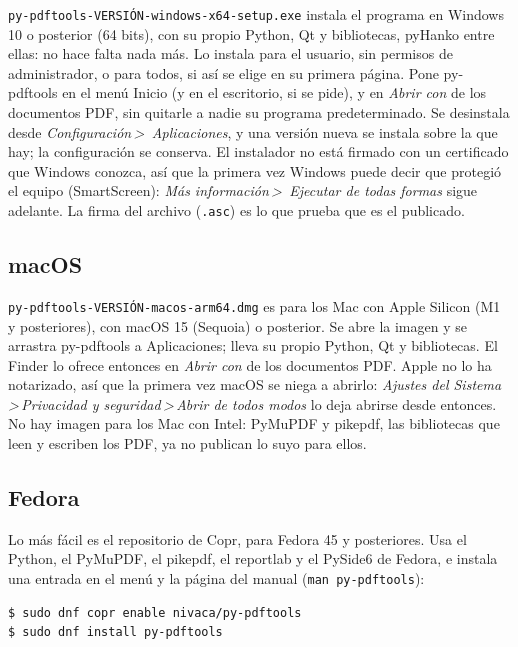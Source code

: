 \documentclass[12pt,
              article,
              oneside
              ]{memoir}
\newcommand*{\menu}[1]{\textit{#1}}
\newcommand*{\then}{\,>\,}
\begin{document}
%
\texttt{py-pdftools-VERSIÓN-windows-x64-setup.exe} instala el programa en
Windows 10 o posterior (64 bits), con su propio Python, Qt y bibliotecas,
pyHanko entre ellas: no hace falta nada más. Lo instala para el usuario,
sin permisos de administrador, o para todos, si así se elige en su primera
página. Pone py-pdftools en el menú Inicio (y en el escritorio, si se
pide), y en \menu{Abrir con} de los documentos PDF, sin quitarle a nadie
su programa predeterminado. Se desinstala desde \menu{Configuración\then
Aplicaciones}, y una versión nueva se instala sobre la que hay; la
configuración se conserva. El instalador no está firmado con un
certificado que Windows conozca, así que la primera vez Windows puede
decir que protegió el equipo (SmartScreen): \menu{Más información\then
Ejecutar de todas formas} sigue adelante. La firma del archivo
(\texttt{.asc}) es lo que prueba que es el publicado.

\subsection{macOS}

%
\texttt{py-pdftools-VERSIÓN-macos-arm64.dmg} es para los Mac con Apple
Silicon (M1 y posteriores), con macOS 15 (Sequoia) o posterior. Se abre la
imagen y se arrastra py-pdftools a Aplicaciones; lleva su propio Python,
Qt y bibliotecas. El Finder lo ofrece entonces en \menu{Abrir con} de los
documentos PDF. Apple no lo ha notarizado, así que la primera vez macOS se
niega a abrirlo: \menu{Ajustes del Sistema\then Privacidad y
seguridad\then Abrir de todos modos} lo deja abrirse desde entonces. No
hay imagen para los Mac con Intel: PyMuPDF y pikepdf, las bibliotecas que
leen y escriben los PDF, ya no publican lo suyo para ellos.

\subsection{Fedora}

%
Lo más fácil es el repositorio de Copr, para Fedora 45 y posteriores. Usa
el Python, el PyMuPDF, el pikepdf, el reportlab y el PySide6 de Fedora, e
instala una entrada en el menú y la página del manual
(\texttt{man py-pdftools}):

\begin{verbatim}
$ sudo dnf copr enable nivaca/py-pdftools
$ sudo dnf install py-pdftools
\end{verbatim}
\end{document}
